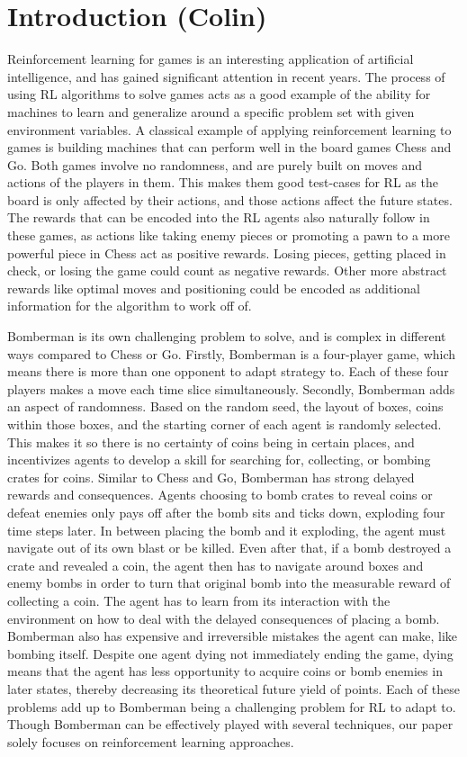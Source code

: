 \documentclass[article, 10pt]{IEEEtran}
\begin{document}
\section{Introduction (Colin)}\label{sec:1_introduction}
Reinforcement learning for games is an interesting application of artificial intelligence, and has gained significant attention in recent years. The process of using RL algorithms to solve games acts as a good example of the ability for machines to learn and generalize around a specific problem set with given environment variables. A classical example of applying reinforcement learning to games is building machines that can perform well in the board games Chess and Go. Both games involve no randomness, and are purely built on moves and actions of the players in them. This makes them good test-cases for RL as the board is only affected by their actions, and those actions affect the future states. The rewards that can be encoded into the RL agents also naturally follow in these games, as actions like taking enemy pieces or promoting a pawn to a more powerful piece in Chess act as positive rewards. Losing pieces, getting placed in check, or losing the game could count as negative rewards. Other more abstract rewards like optimal moves and positioning could be encoded as additional information for the algorithm to work off of.

Bomberman is its own challenging problem to solve, and is complex in different ways compared to Chess or Go. Firstly, Bomberman is a four-player game, which means there is more than one opponent to adapt strategy to. Each of these four players makes a move each time slice simultaneously. Secondly, Bomberman adds an aspect of randomness. Based on the random seed, the layout of boxes, coins within those boxes, and the starting corner of each agent is randomly selected. This makes it so there is no certainty of coins being in certain places, and incentivizes agents to develop a skill for searching for, collecting, or bombing crates for coins. Similar to Chess and Go, Bomberman has strong delayed rewards and consequences. Agents choosing to bomb crates to reveal coins or defeat enemies only pays off after the bomb sits and ticks down, exploding four time steps later. In between placing the bomb and it exploding, the agent must navigate out of its own blast or be killed. Even after that, if a bomb destroyed a crate and revealed a coin, the agent then has to navigate around boxes and enemy bombs in order to turn that original bomb into the measurable reward of collecting a coin. The agent has to learn from its interaction with the environment on how to deal with the delayed consequences of placing a bomb. Bomberman also has expensive and irreversible mistakes the agent can make, like bombing itself. Despite one agent dying not immediately ending the game, dying means that the agent has less opportunity to acquire coins or bomb enemies in later states, thereby decreasing its theoretical future yield of points. Each of these problems add up to Bomberman being a challenging problem for RL to adapt to. Though Bomberman can be effectively played with several techniques, our paper solely focuses on reinforcement learning approaches. 
\end{document}
